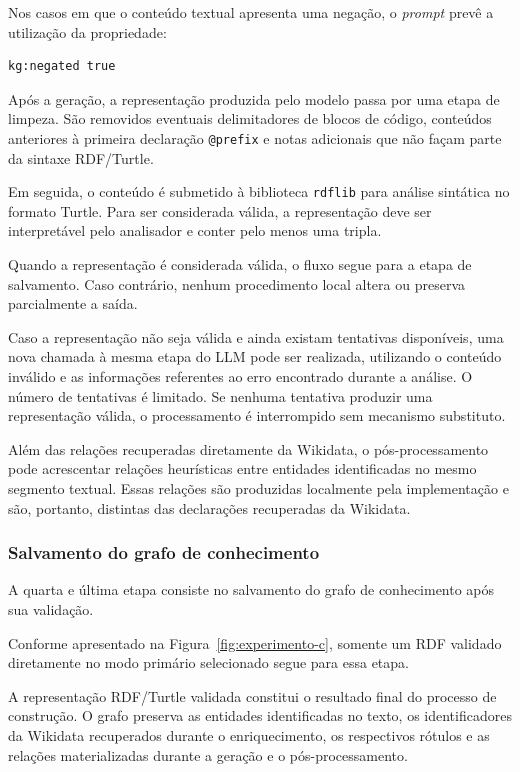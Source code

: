 Nos casos em que o conteúdo textual apresenta uma negação, o \textit{prompt} prevê a utilização da propriedade:

\begin{verbatim}
kg:negated true
\end{verbatim}

Após a geração, a representação produzida pelo modelo passa por uma etapa de limpeza. São removidos eventuais delimitadores de blocos de código, conteúdos anteriores à primeira declaração \texttt{@prefix} e notas adicionais que não façam parte da sintaxe RDF/Turtle.

Em seguida, o conteúdo é submetido à biblioteca \texttt{rdflib} para análise sintática no formato Turtle. Para ser considerada válida, a representação deve ser interpretável pelo analisador e conter pelo menos uma tripla.

Quando a representação é considerada válida, o fluxo segue para a etapa de salvamento. Caso contrário, nenhum procedimento local altera ou preserva parcialmente a saída.

Caso a representação não seja válida e ainda existam tentativas disponíveis, uma nova chamada à mesma etapa do LLM pode ser realizada, utilizando o conteúdo inválido e as informações referentes ao erro encontrado durante a análise. O número de tentativas é limitado. Se nenhuma tentativa produzir uma representação válida, o processamento é interrompido sem mecanismo substituto.

Além das relações recuperadas diretamente da Wikidata, o pós-processamento pode acrescentar relações heurísticas entre entidades identificadas no mesmo segmento textual. Essas relações são produzidas localmente pela implementação e são, portanto, distintas das declarações recuperadas da Wikidata.


\subsubsection{Salvamento do grafo de conhecimento}

A quarta e última etapa consiste no salvamento do grafo de conhecimento após sua validação.

Conforme apresentado na Figura~\ref{fig:experimento-c}, somente um RDF validado diretamente no modo primário selecionado segue para essa etapa.

A representação RDF/Turtle validada constitui o resultado final do processo de construção. O grafo preserva as entidades identificadas no texto, os identificadores da Wikidata recuperados durante o enriquecimento, os respectivos rótulos e as relações materializadas durante a geração e o pós-processamento.

